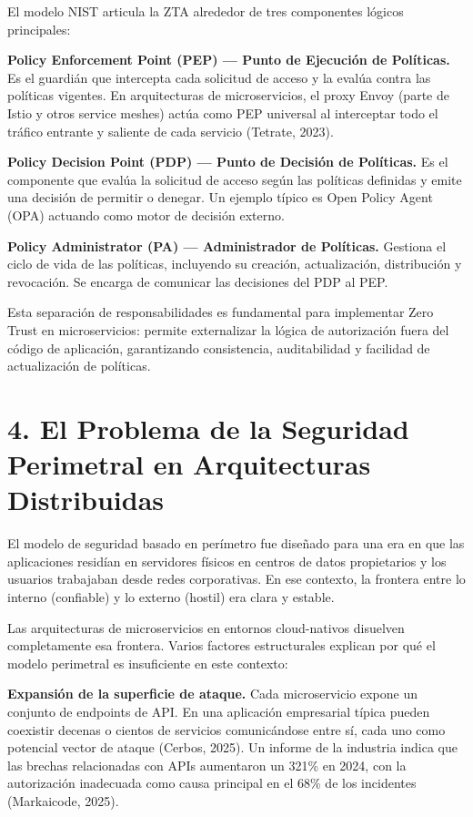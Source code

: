 \documentclass[12pt,a4paper]{article}
\begin{document}
El modelo NIST articula la ZTA alrededor de tres componentes lógicos principales:

\textbf{Policy Enforcement Point (PEP) — Punto de Ejecución de Políticas.} Es el guardián que intercepta cada solicitud de acceso y la evalúa contra las políticas vigentes. En arquitecturas de microservicios, el proxy Envoy (parte de Istio y otros service meshes) actúa como PEP universal al interceptar todo el tráfico entrante y saliente de cada servicio (Tetrate, 2023).

\textbf{Policy Decision Point (PDP) — Punto de Decisión de Políticas.} Es el componente que evalúa la solicitud de acceso según las políticas definidas y emite una decisión de permitir o denegar. Un ejemplo típico es Open Policy Agent (OPA) actuando como motor de decisión externo.

\textbf{Policy Administrator (PA) — Administrador de Políticas.} Gestiona el ciclo de vida de las políticas, incluyendo su creación, actualización, distribución y revocación. Se encarga de comunicar las decisiones del PDP al PEP.

Esta separación de responsabilidades es fundamental para implementar Zero Trust en microservicios: permite externalizar la lógica de autorización fuera del código de aplicación, garantizando consistencia, auditabilidad y facilidad de actualización de políticas.



\section{4. El Problema de la Seguridad Perimetral en Arquitecturas Distribuidas}

El modelo de seguridad basado en perímetro fue diseñado para una era en que las aplicaciones residían en servidores físicos en centros de datos propietarios y los usuarios trabajaban desde redes corporativas. En ese contexto, la frontera entre lo interno (confiable) y lo externo (hostil) era clara y estable.

Las arquitecturas de microservicios en entornos cloud-nativos disuelven completamente esa frontera. Varios factores estructurales explican por qué el modelo perimetral es insuficiente en este contexto:

\textbf{Expansión de la superficie de ataque.} Cada microservicio expone un conjunto de endpoints de API. En una aplicación empresarial típica pueden coexistir decenas o cientos de servicios comunicándose entre sí, cada uno como potencial vector de ataque (Cerbos, 2025). Un informe de la industria indica que las brechas relacionadas con APIs aumentaron un 321\% en 2024, con la autorización inadecuada como causa principal en el 68\% de los incidentes (Markaicode, 2025).
\end{document}
